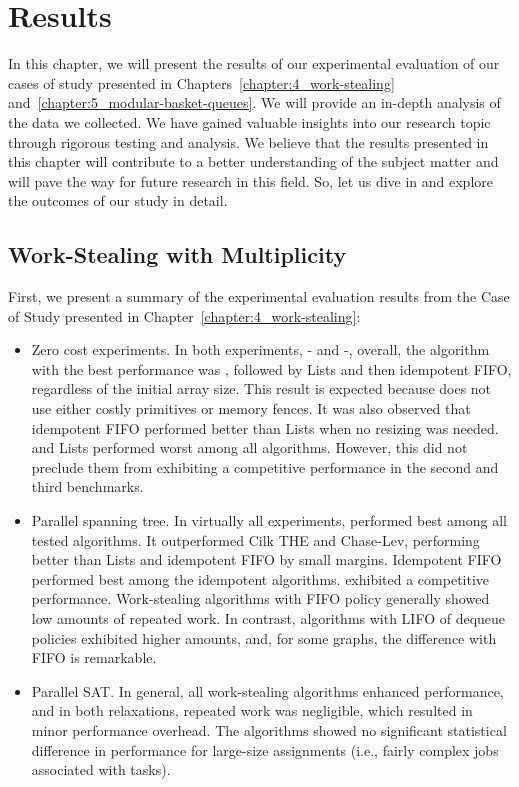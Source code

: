 \chapter{\label{chapter:6_Results}Results}

In this chapter, we will present the results of our experimental evaluation of our cases of study presented in Chapters~\ref{chapter:4_work-stealing} and~\ref{chapter:5_modular-basket-queues}. We will provide an in-depth analysis of the data we collected. We have gained valuable insights into our research topic through rigorous testing and analysis. We believe that the results presented in this chapter will contribute to a better understanding of the subject matter and will pave the way for future research in this field. So, let us dive in and explore the outcomes of our study in detail.

\section{Work-Stealing with Multiplicity}

First, we present a summary of the experimental evaluation results from the Case of Study presented in Chapter~\ref{chapter:4_work-stealing}:

\begin{itemize}
\item Zero cost experiments. In both experiments, \Puts{}-\Takes{} and \Puts-\Steals{}, overall, the algorithm with the best performance was \NCWSM, followed by \NCWSM Lists and then idempotent FIFO, regardless of the initial array size. This result is expected because \NCWSM does not use either costly primitives or memory fences. It was also observed that idempotent FIFO performed better than \NCWSM Lists when no resizing was needed. \BNCWSM and \BNCWSM Lists performed worst among all algorithms. However, this did not preclude them from exhibiting a competitive performance in the second and third benchmarks.

\item Parallel spanning tree. In virtually all experiments, \NCWSM performed best among all tested algorithms. It outperformed Cilk THE and Chase-Lev, performing better than \NCWSM Lists and idempotent FIFO by small margins. Idempotent FIFO performed best among the idempotent algorithms.  \BNCWSM exhibited a competitive performance. Work-stealing algorithms with FIFO policy generally showed low amounts of repeated work. In contrast, algorithms with LIFO of dequeue policies exhibited higher amounts, and, for some graphs, the difference with FIFO is remarkable.

\item Parallel SAT. In general, all work-stealing algorithms enhanced performance, and in both relaxations, repeated work was negligible, which resulted in minor performance overhead. The algorithms showed no significant statistical difference in performance for large-size assignments (i.e., fairly complex jobs associated with tasks).

\end{itemize}

